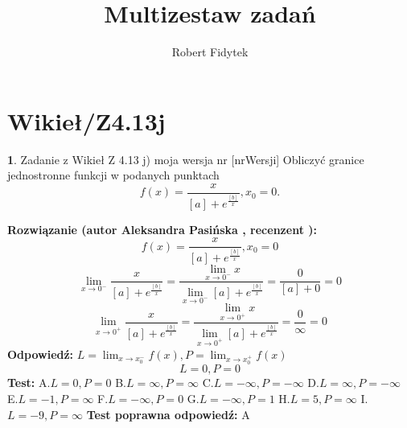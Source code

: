 \documentclass[12pt, a4paper]{article}
\title{Multizestaw zadań}
\author{Robert Fidytek}
\date{}
\theoremstyle{definition} %
\newtheorem{zad}{}
\newcommand{\kategoria}[1]{\section{#1}} %
\newcommand{\zadStart}[1]{\begin{zad}#1\newline} %
\newcommand{\zadStop}{\end{zad}}   %
\newcommand{\rozwStart}[2]{\noindent \textbf{Rozwiązanie (autor #1 , recenzent #2): }\newline} %
\newcommand{\rozwStop}{\newline}                                            %
\newcommand{\odpStart}{\noindent \textbf{Odpowiedź:}\newline}    %
\newcommand{\odpStop}{\newline}                                             %
\newcommand{\testStart}{\noindent \textbf{Test:}\newline} %
\newcommand{\testStop}{\newline} %
\newcommand{\kluczStart}{\noindent \textbf{Test poprawna odpowiedź:}\newline} %
\newcommand{\kluczStop}{\newline} %
\begin{document}
\maketitle


\kategoria{Wikieł/Z4.13j}
\zadStart{Zadanie z Wikieł Z 4.13 j) moja wersja nr [nrWersji]}
Obliczyć granice jednostronne funkcji w podanych punktach $$f(x)=\frac{x}{[a]+e^{\frac{[b]}{x}}},x_{0}=0.$$
\zadStop
\rozwStart{Aleksandra Pasińska}{}
$$f(x)=\frac{x}{[a]+e^{\frac{[b]}{x}}},x_{0}=0$$
$$\lim_{x\rightarrow 0^-}\frac{x}{[a]+e^{\frac{[b]}{x}}}=\frac{\lim_{x\rightarrow 0^-}x}{\lim_{x\rightarrow 0^-}[a]+e^{\frac{[b]}{x}}}=\frac{0}{[a]+0}=0$$ 
$$\lim_{x\rightarrow 0^+}\frac{x}{[a]+e^{\frac{[b]}{x}}}=\frac{\lim_{x\rightarrow 0^+}x}{\lim_{x\rightarrow 0^+}[a]+e^{\frac{[b]}{x}}}=\frac{0}{\infty}=0$$ 
\rozwStop
\odpStart
$ L=\lim_{x\rightarrow x_{0}^-}f(x), P=\lim_{x\rightarrow x_{0}^+}f(x)$
$$L=0, P=0$$
\odpStop
\testStart
A.$ L=0, P=0 $
B.$L=\infty, P=\infty$
C.$L=-\infty, P=-\infty$
D.$L=\infty, P=-\infty$
E.$L=-1, P=\infty$
F.$L=-\infty, P=0$
G.$L=-\infty, P=1$
H.$L=5, P=\infty$
I.$L=-9, P=\infty$
\testStop
\kluczStart
A
\kluczStop
\end{document}
